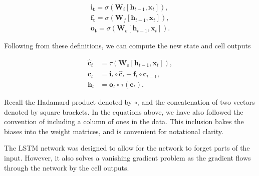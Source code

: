 \begin{align}
\boldsymbol{i_t} = \sigma(\boldsymbol{W}_i[\boldsymbol{h}_{t-1}, \boldsymbol{x}_t]),\\
\boldsymbol{f_t} = \sigma(\boldsymbol{W}_f[\boldsymbol{h}_{t-1}, \boldsymbol{x}_t]),\\
\boldsymbol{o_t} = \sigma(\boldsymbol{W}_o[\boldsymbol{h}_{t-1}, \boldsymbol{x}_t]).
\end{align}

\noindent Following from these definitions, we can compute the new state and cell outputs

\begin{align}
\hat{\boldsymbol{c}}_t &= \tau (\boldsymbol{W}_o[\boldsymbol{h}_{t-1}, \boldsymbol{x}_t]), \\
\boldsymbol{c}_t &= \boldsymbol{i}_t \circ \hat{\boldsymbol{c}}_t + \boldsymbol{f}_t \circ \boldsymbol{c}_{t-1}, \\ 
\boldsymbol{h}_t &= \boldsymbol{o}_t \circ \tau (\boldsymbol{c}_t).
\end{align}

\noindent Recall the Hadamard product denoted by $\circ$, and the concatenation of two vectors denoted by square brackets. In the equations above, we have also followed the convention of including a column of ones in the data. This inclusion bakes the biases into the weight matrices, and is convenient for notational clarity. 

The LSTM network was designed to allow for the network to forget parts of the input. However, it also solves a vanishing gradient problem as the gradient flows through the network by the cell outputs.
